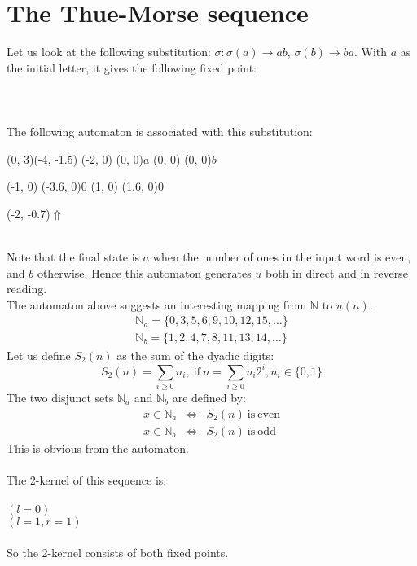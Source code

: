 \documentclass{article}
\begin{document}
\section*{The Thue-Morse sequence}
Let us look at the following substitution: $\sigma: \sigma(a) \rightarrow ab$,
$\sigma(b) \rightarrow ba$. With $a$ as the initial letter, it gives the
following fixed point:\\
\\
\\
\\
The following automaton is associated with this
substitution:\\
\begin{graph}(0, 3)(-4, -1.5)
  (-2, 0) (0, 0){$a$}
  (0, 0)  (0, 0){$b$}

  (-1, 0) \freetext(-3.6, 0){0}
   
   
  (1, 0) \freetext(1.6, 0){0}

  \freetext(-2, -0.7){$\Uparrow$}
\end{graph}\\
Note that the final state is $a$ when the number of ones in the input word
is even, and $b$ otherwise. Hence this automaton generates $u$ both in direct
and in reverse reading.\\
The automaton above suggests an interesting mapping from $\mathbb{N}$ to
$u(n)$. 
\begin{eqnarray*}
\mathbb{N}_a = \{0, 3, 5, 6, 9, 10, 12, 15, \ldots\}\\
\mathbb{N}_b = \{1, 2, 4, 7, 8, 11, 13, 14, \ldots\}
\end{eqnarray*}
Let us define $S_2(n)$ as the sum of the dyadic digits:
\begin{displaymath}
S_2(n) = \sum_{i \ge 0}n_i,\mathrm{\ if\ }
n = \sum_{i \ge 0}n_i2^i, n_i \in \{0, 1\}
\end{displaymath}
The two disjunct sets $\mathbb{N}_a$ and $\mathbb{N}_b$ are defined by:
\begin{eqnarray*}
x \in \mathbb{N}_a &\Leftrightarrow& S_2(n) \mathrm{\ is\ even}\\
x \in \mathbb{N}_b &\Leftrightarrow& S_2(n) \mathrm{\ is\ odd}
\end{eqnarray*}
This is obvious from the automaton.\\
\\
The 2-kernel of this sequence is:\\
\\
 $(l = 0)$\\
 $(l = 1, r = 1)$\\
\\
So the 2-kernel consists of both fixed points.
\end{document}
